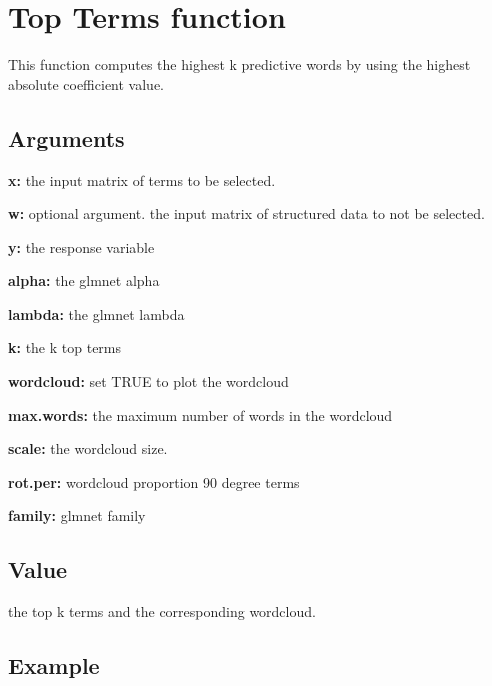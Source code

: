 \documentclass[]{article}
\begin{document}
\section{Top Terms function}\label{top-terms-function}

This function computes the highest k predictive words by using the
highest absolute coefficient value.

\subsection{Arguments}\label{arguments-10}

\textbf{x:} the input matrix of terms to be selected.

\textbf{w:} optional argument. the input matrix of structured data to
not be selected.

\textbf{y:} the response variable

\textbf{alpha:} the glmnet alpha

\textbf{lambda:} the glmnet lambda

\textbf{k:} the k top terms

\textbf{wordcloud:} set TRUE to plot the wordcloud

\textbf{max.words:} the maximum number of words in the wordcloud

\textbf{scale:} the wordcloud size.

\textbf{rot.per:} wordcloud proportion 90 degree terms

\textbf{family:} glmnet family

\subsection{Value}\label{value-10}

the top k terms and the corresponding wordcloud.

\subsection{Example}\label{example-9}
\end{document}
